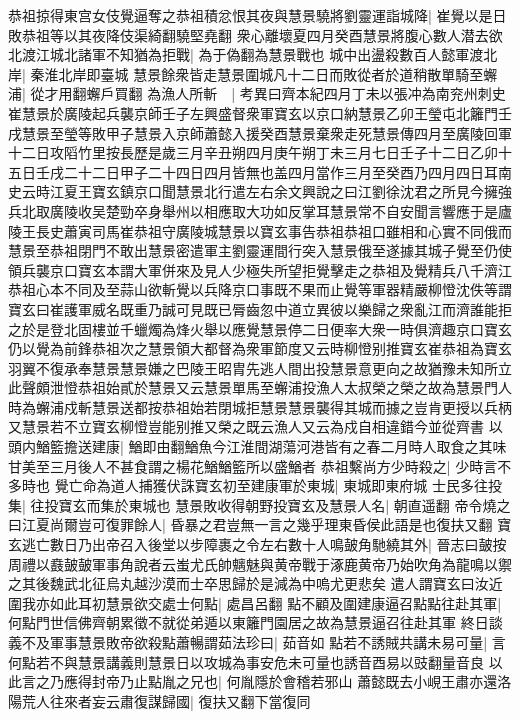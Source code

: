 恭祖掠得東宫女伎覺逼奪之恭祖積忿恨其夜與慧景驍將劉靈運詣城降|{
	崔覺以是日敗恭祖等以其夜降伎渠綺翻驍堅堯翻}
衆心離壞夏四月癸酉慧景將腹心數人潜去欲北渡江城北諸軍不知猶為拒戰|{
	為于偽翻為慧景戰也}
城中出盪殺數百人懿軍渡北岸|{
	秦淮北岸即臺城}
慧景餘衆皆走慧景圍城凡十二日而敗從者於道稍散單騎至蠏浦|{
	從才用翻蠏戶買翻}
為漁人所斬　|{
	考異曰齊本紀四月丁未以張冲為南兖州刺史崔慧景於廣陵起兵襲京師壬子左興盛督衆軍寶玄以京口納慧景乙卯王瑩屯北籬門壬戌慧景至瑩等敗甲子慧景入京師蕭懿入援癸酉慧景棄衆走死慧景傳四月至廣陵回軍十二日攻䧟竹里按長歷是歲三月辛丑朔四月庚午朔丁未三月七日壬子十二日乙卯十五日壬戌二十二日甲子二十四日四月皆無也盖四月當作三月至癸酉乃四月四日耳南史云時江夏王寶玄鎮京口聞慧景北行遣左右余文興說之曰江劉徐沈君之所見今擁強兵北取廣陵收吴楚勁卒身舉州以相應取大功如反掌耳慧景常不自安聞言響應于是廬陵王長史蕭寅司馬崔恭祖守廣陵城慧景以寶玄事告恭祖恭祖口雖相和心實不同俄而慧景至恭祖閉門不敢出慧景密遣軍主劉靈運間行突入慧景俄至遂據其城子覺至仍使領兵襲京口寶玄本謂大軍併來及見人少極失所望拒覺擊走之恭祖及覺精兵八千濟江恭祖心本不同及至蒜山欲斬覺以兵降京口事既不果而止覺等軍器精嚴柳憕沈佚等謂寶玄曰崔護軍威名既重乃誠可見既已脣齒忽中道立異彼以樂歸之衆亂江而濟誰能拒之於是登北固樓並千蠟燭為烽火舉以應覺慧景停二日便率大衆一時俱濟趣京口寶玄仍以覺為前鋒恭祖次之慧景領大都督為衆軍節度又云時柳憕别推寶玄崔恭祖為寶玄羽翼不復承奉慧景慧景嫌之巴陵王昭胄先逃人間出投慧景意更向之故猶豫未知所立此聲頗泄憕恭祖始貳於慧景又云慧景單馬至蠏浦投漁人太叔榮之榮之故為慧景門人時為蠏浦戍斬慧景送都按恭祖始若閉城拒慧景慧景襲得其城而據之豈肯更授以兵柄又慧景若不立寶玄柳憕豈能别推又榮之既云漁人又云為戍自相違錯今並從齊書}
以頭内鰌籃擔送建康|{
	鰌即由翻鰌魚今江淮間湖蕩河港皆有之春二月時人取食之其味甘美至三月後人不甚食謂之楊花鰌鰌籃所以盛鰌者}
恭祖繫尚方少時殺之|{
	少時言不多時也}
覺亡命為道人捕獲伏誅寶玄初至建康軍於東城|{
	東城即東府城}
士民多往投集|{
	往投寶玄而集於東城也}
慧景敗收得朝野投寶玄及慧景人名|{
	朝直遥翻}
帝令燒之曰江夏尚爾豈可復罪餘人|{
	昏暴之君豈無一言之幾乎理東昏侯此語是也復扶又翻}
寶玄逃亡數日乃出帝召入後堂以步障裹之令左右數十人鳴皷角馳繞其外|{
	晉志曰皷按周禮以鼖皷皷軍事角說者云蚩尤氏帥魑魅與黄帝戰于涿鹿黄帝乃始吹角為龍鳴以禦之其後魏武北征烏丸越沙漠而士卒思歸於是減為中嗚尤更悲矣}
遣人謂寶玄曰汝近圍我亦如此耳初慧景欲交處士何點|{
	處昌呂翻}
點不顧及圍建康逼召點點往赴其軍|{
	何點門世信佛齊朝累徵不就從弟遁以東籬門園居之故為慧景逼召往赴其軍}
終日談義不及軍事慧景敗帝欲殺點蕭暢謂茹法珍曰|{
	茹音如}
點若不誘賊共講未易可量|{
	言何點若不與慧景講義則慧景日以攻城為事安危未可量也誘音酉易以豉翻量音良}
以此言之乃應得封帝乃止點胤之兄也|{
	何胤隱於會稽若邪山}
蕭懿既去小峴王肅亦還洛陽荒人往來者妄云肅復謀歸國|{
	復扶又翻下當復同}
